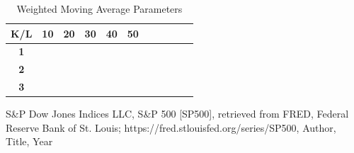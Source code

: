 \documentclass[a4paper,12pt,fleqn]{article}
\begin{document}
                \begin{table}[ht]
                    \centering
                    \begin{tabular}{|c|c|c|c|c|c|c|c|c|c|c|}
                        \hline
                        \textbf{K/L} & \textbf{10} & \textbf{20} & \textbf{30} & \textbf{40} & \textbf{50} \\
                        \hline
                        \textbf{1} & & & \\
                        \hline
                        \textbf{2} & & & \\
                        \hline
                        \textbf{3} & & & \\
                        \hline
                    \end{tabular}
                    \caption{Weighted Moving Average Parameters}
                    \label{tab:WMA_parameters}
                \end{table}



             



        \newpage
        \begin{thebibliography}{99}
         S\&P Dow Jones Indices LLC, S\&P 500 [SP500], retrieved from FRED, Federal Reserve Bank of St. Louis; https://fred.stlouisfed.org/series/SP500, 
         Author, Title, Year
        \end{thebibliography}
         
\end{document}
